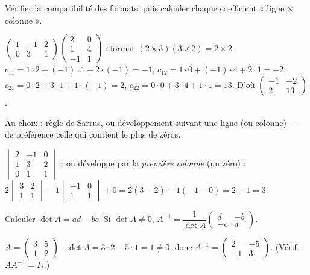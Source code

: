 Vérifier la compatibilité des formats, puis calculer chaque coefficient « ligne $\times$ colonne ».
\begin{exemple}
$\begin{pmatrix}1&-1&2\\0&3&1\end{pmatrix}\begin{pmatrix}2&0\\1&4\\-1&1\end{pmatrix}$ :
format $(2\times3)(3\times2)=2\times2$.
$c_{11}=1\cdot2+(-1)\cdot1+2\cdot(-1)=-1$, $c_{12}=1\cdot0+(-1)\cdot4+2\cdot1=-2$,
$c_{21}=0\cdot2+3\cdot1+1\cdot(-1)=2$, $c_{22}=0\cdot0+3\cdot4+1\cdot1=13$. D'où
$\begin{pmatrix}-1&-2\\2&13\end{pmatrix}$.
\end{exemple}

Au choix : règle de Sarrus, ou développement suivant une ligne (ou colonne) — de préférence
celle qui contient le plus de zéros.
\begin{exemple}
$\begin{vmatrix}2&-1&0\\1&3&2\\0&1&1\end{vmatrix}$ : on développe par la \emph{première colonne}
(un zéro) : $2\begin{vmatrix}3&2\\1&1\end{vmatrix}-1\begin{vmatrix}-1&0\\1&1\end{vmatrix}+0
=2(3-2)-1(-1-0)=2+1=3.$
\end{exemple}

Calculer $\det A=ad-bc$. Si $\det A\neq0$, $A^{-1}=\dfrac1{\det A}\begin{pmatrix}d&-b\\-c&a\end{pmatrix}$.
\begin{exemple}
$A=\begin{pmatrix}3&5\\1&2\end{pmatrix}$ : $\det A=3\cdot2-5\cdot1=1\neq0$, donc
$A^{-1}=\begin{pmatrix}2&-5\\-1&3\end{pmatrix}$. (Vérif. : $A A^{-1}=I_2$.)
\end{exemple}

